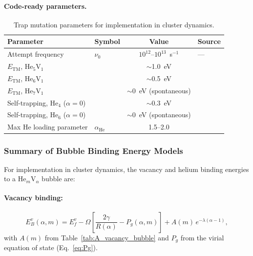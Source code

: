 \documentclass[pdflatex,sn-basic]{sn-jnl} %
\begin{document}
\paragraph{Code-ready parameters.}
\begin{table}[htbp]
\centering
\caption{Trap mutation parameters for implementation in cluster dynamics.}
\label{tab:TM_params}
\renewcommand{\arraystretch}{1.2}
\begin{tabular}{@{}llcl@{}}
\toprule
\textbf{Parameter} & \textbf{Symbol} & \textbf{Value} & \textbf{Source} \\
\midrule
Attempt frequency & $\nu_0$ & $10^{12}$--$10^{13}$~s$^{-1}$ & --- \\
$E_{\mathrm{TM}}$, He$_5$V$_1$ & & $\sim$1.0~eV & \citet{Morishita2003} \\
$E_{\mathrm{TM}}$, He$_6$V$_1$ & & $\sim$0.5~eV & \citet{Morishita2003} \\
$E_{\mathrm{TM}}$, He$_7$V$_1$ & & $\sim$0~eV (spontaneous) & \citet{Gao2011_HeFe} \\
Self-trapping, He$_4$ ($\alpha=0$) & & $\sim$0.3~eV & \citet{Gao2011_HeFe} \\
Self-trapping, He$_6$ ($\alpha=0$) & & $\sim$0~eV (spontaneous) & \citet{Gao2011_HeFe} \\
Max He loading parameter & $\alpha_{\mathrm{He}}$ & 1.5--2.0 & \citet{Morishita2003,Fu2005He} \\
\bottomrule
\end{tabular}
\end{table}

\subsubsection{Summary of Bubble Binding Energy Models}
\label{sec:bubble_summary}

For implementation in cluster dynamics, the vacancy and helium binding energies
to a He$_m$V$_\alpha$ bubble are:

\paragraph{Vacancy binding:}
\begin{equation}\label{eq:EbV_summary}
    E_B^v(\alpha,m) = E_f^v - \Omega\!\left[\frac{2\gamma}{R(\alpha)}
    - P_g(\alpha,m)\right] + A(m)\,e^{-\lambda(\alpha-1)},
\end{equation}
with $A(m)$ from Table~\ref{tab:A_vacancy_bubble} and $P_g$ from the virial
equation of state (Eq.~\ref{eq:Pg}).
\end{document}
